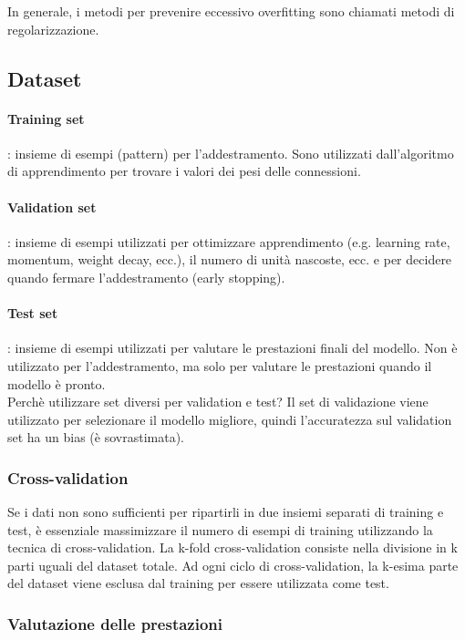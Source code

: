 In generale, i metodi per prevenire eccessivo overfitting sono chiamati metodi
di regolarizzazione.

\subsection{Dataset}

\paragraph{Training set}: insieme di esempi (pattern) per l'addestramento. Sono
utilizzati dall'algoritmo di apprendimento per trovare i valori dei pesi delle
connessioni.

\paragraph{Validation set}: insieme di esempi utilizzati per ottimizzare
apprendimento (e.g. learning rate, momentum, weight decay, ecc.), il numero di
unità nascoste, ecc. e per decidere quando fermare l'addestramento (early
stopping).

\paragraph{Test set}: insieme di esempi utilizzati per valutare le prestazioni
finali del modello. Non è utilizzato per l'addestramento, ma solo per valutare 
le prestazioni quando il modello è pronto.\\

Perchè utilizzare set diversi per validation e test? Il set di validazione viene
utilizzato per selezionare il modello migliore, quindi l'accuratezza sul
validation set ha un bias (è sovrastimata).

\subsubsection{Cross-validation}

Se i dati non sono sufficienti per ripartirli in due insiemi separati di
training e test, è essenziale massimizzare il numero di esempi di training
utilizzando la tecnica di cross-validation. La k-fold cross-validation consiste
nella divisione in k parti uguali del dataset totale. Ad ogni ciclo di
cross-validation, la k-esima parte del dataset viene esclusa dal training per
essere utilizzata come test.

\subsubsection{Valutazione delle prestazioni}

